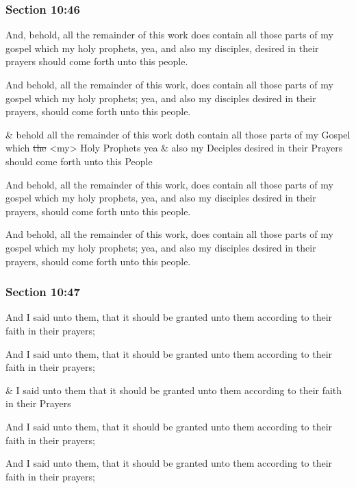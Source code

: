 	\subsubsection{Section 10:46} %
		\label{DC10-46}

		And, behold, all the remainder of this work does contain all those parts of my gospel which my holy prophets, yea, and also my disciples, desired in their prayers should come forth unto this people.

		\begin{framed}
		\scriptsize
			\begin{compactdesc}
				\item[JSP] And behold, all the remainder of this work, does contain all those parts of my gospel which my holy prophets; yea, and also my disciples desired in their prayers, should come forth unto this people.
				\item[RB1] \& behold all the remainder of this work doth contain all those parts of my Gospel which \sout{the} <my> Holy Prophets yea \& also my Deciples desired in their Prayers should come forth unto this People
				\item[DC 1835] And behold, all the remainder of this work, does contain all those parts of my gospel which my holy prophets, yea, and also my disciples desired in their prayers, should come forth unto this people.
				\item[DC 1844] And behold, all the remainder of this work, does contain all those parts of my gospel which my holy prophets; yea, and also my disciples desired in their prayers, should come forth unto this people.
			\end{compactdesc}
		\end{framed}

	\subsubsection{Section 10:47} %
		\label{DC10-47}

		And I said unto them, that it should be granted unto them according to their faith in their prayers;

		\begin{framed}
		\scriptsize
			\begin{compactdesc}
				\item[JSP] And I said unto them, that it should be granted unto them according to their faith in their prayers;
				\item[RB1] \& I said unto them that it should be granted unto them according to their faith in their Prayers 
				\item[DC 1835] And I said unto them, that it should be granted unto them according to their faith in their prayers; 
				\item[DC 1844] And I said unto them, that it should be granted unto them according to their faith in their prayers; 
			\end{compactdesc}
		\end{framed}

